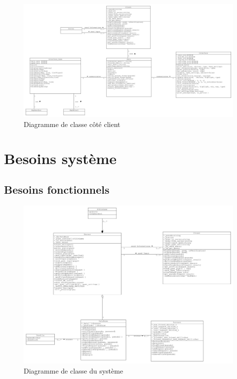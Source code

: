 \documentclass[a4paper,12pt]{article}
\begin{document}
\begin{figure}[hbtp]
\centering
\includegraphics[scale=0.3, angle=90]{images/newClientClassDiagram.jpg}
\caption{Diagramme de classe côté client}
\end{figure}

\newpage

\section{Besoins système}
\subsection{Besoins fonctionnels}

\begin{figure}[h!]
\centering
\includegraphics[width=16cm]{images/newSystemClassDiagram.jpg}
\caption{Diagramme de classe du système}
\label{fig:UerUseCase}
\end{figure}
\end{document}
